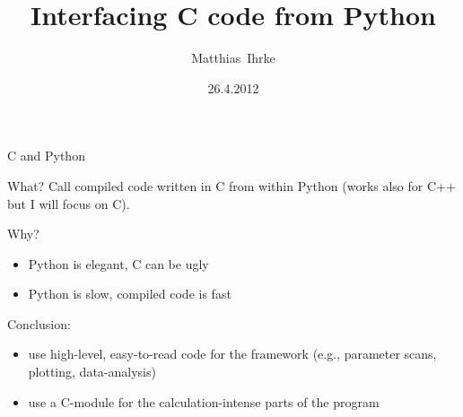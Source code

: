 \documentclass[german]{beamer}
\begin{document}
\lstset{language=Python,
  showstringspaces=false,
  frame=shadowbox,
  style=mypython,
  basicstyle=\ttfamily\footnotesize
}
 
\title[C and Python]{Interfacing C code from Python}
\author{Matthias~Ihrke}

\date{26.4.2012}


\begin{frame}[label=mytitle]
  \titlepage 
\end{frame}


\begin{frame}[fragile]{C and Python}

\begin{block}{What?}
  Call compiled code written in C from within Python (works also for
  C++ but I will focus on C).
\end{block}

\begin{block}{Why?}
\begin{itemize}
\item Python is elegant, C can be ugly 
\item Python is slow, compiled code is fast
\end{itemize}

Conclusion:
\begin{itemize}
\item use high-level, easy-to-read code for the framework (e.g.,
  parameter scans, plotting, data-analysis)
\item use a C-module for the calculation-intense parts of the program
\end{itemize}

\end{block}
\end{frame}

\end{document}
